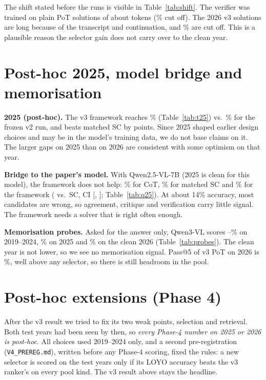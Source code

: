 \documentclass[conference]{IEEEtran}
\begin{document}
The shift stated before the runs is visible in Table~\ref{tab:shift}. The verifier was trained on
plain PoT solutions of about \TokTrain{} tokens (\TruncTrain\% cut off). The 2026 v3 solutions are
\TokTest{} long because of the transcript and continuation, and \TruncTest\% are cut off. This is a
plausible reason the selector gain does not carry over to the clean year.



\section{Post-hoc 2025, model bridge and memorisation}

\textbf{2025 (post-hoc).} The v3 framework reaches \PostAcc\% (Table~\ref{tab:t25}) vs.\
\PostTwoAcc\% for the frozen v2 run, and beats matched SC by \PostVsSc{} points. Since 2025 shaped
earlier design choices and may be in the model's training data, we do not base claims on it. The
larger gaps on 2025 than on 2026 are consistent with some optimism on that year.


\textbf{Bridge to the paper's model.} With Qwen2.5-VL-7B (2025 is clean for this model), the
framework does not help: \QBase\% for CoT, \QSc\% for matched SC and \QFull\% for the framework
(\QVsSc{} vs.\ SC, CI [\QVsScLo, \QVsScHi]; Table~\ref{tab:q25}). At about 14\% accuracy, most
candidates are wrong, so agreement, critique and verification carry little signal. The framework
needs a solver that is right often enough.


\textbf{Memorisation probes.} Asked for the answer only, Qwen3-VL scores \ProbeOldLo--\ProbeOldHi\%
on 2019--2024, \ProbeTwentyFive\% on 2025 and \ProbeTwentySix\% on the clean 2026
(Table~\ref{tab:probes}). The clean year is not lower, so we see no memorisation signal. Pass@5 of
v3 PoT on 2026 is \PassFiveThree\%, well above any selector, so there is
still headroom in the pool.

\section{Post-hoc extensions (Phase 4)}\label{sec:v4}
After the v3 result we tried to fix its two weak points, selection and retrieval. Both test years
had been seen by then, so \emph{every Phase-4 number on 2025 or 2026 is post-hoc}. All choices
used 2019--2024 only, and a second pre-registration (\texttt{V4\_PREREG.md}), written before any
Phase-4 scoring, fixed the rules: a new selector is scored on the test years only if its LOYO
accuracy beats the v3 ranker's on every pool kind. The v3 result above stays the headline.
\end{document}
